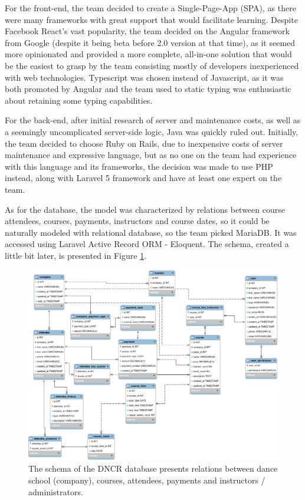 \documentclass{article}
\begin{document}
For the front-end, the team decided to create a Single-Page-App (SPA), as there were many frameworks with great support that would facilitate learning. Despite Facebook React's vast popularity, the team decided on the Angular framework from Google (despite it being beta before 2.0 version at that time), as it seemed more opinionated and provided a more complete, all-in-one solution that would be the easiest to grasp by the team consisting mostly of developers inexperienced with web technologies. Typescript was chosen instead of Javascript, as it was both promoted by Angular and the team used to static typing was enthusiastic about retaining some typing capabilities.

For the back-end, after initial research of server and maintenance costs, as well as a seemingly uncomplicated server-side logic, Java was quickly ruled out. Initially, the team decided to choose Ruby on Rails, due to inexpensive costs of server maintenance and expressive language, but as no one on the team had experience with this language and its frameworks, the decision was made to use PHP instead, along with Laravel 5 framework and have at least one expert on the team.

As for the database, the model was characterized by relations between course attendees, courses, payments, instructors and course dates, so it could be naturally modeled with relational database, so the team picked MariaDB. It was accessed using Laravel Active Record ORM - Eloquent. The schema, created a little bit later, is presented in Figure \ref{fig:schema}.

\begin{figure}[h]
    \includegraphics[width=\textwidth]{schema}
    \caption{The schema of the DNCR database presents relations between dance school (company), courses, attendees, payments and instructors / administrators.}
    \label{fig:schema} 
\end{figure}
\end{document}
